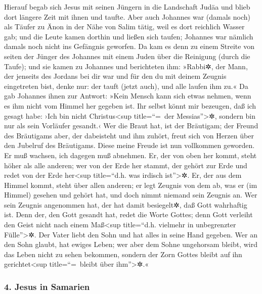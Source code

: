  Hierauf begab sich Jesus mit seinen Jüngern in die
Landschaft Judäa und blieb dort längere Zeit mit ihnen und taufte.
 Aber auch Johannes war (damals noch) als Täufer zu Änon
in der Nähe von Salim tätig, weil es dort reichlich Wasser gab; und die
Leute kamen dorthin und ließen sich taufen;  Johannes war
nämlich damals noch nicht ins Gefängnis geworfen.  Da kam
es denn zu einem Streite von seiten der Jünger des Johannes mit einem
Juden über die Reinigung (durch die Taufe);  und sie
kamen zu Johannes und berichteten ihm: »Rabbi✲, der Mann, der jenseits
des Jordans bei dir war und für den du mit deinem Zeugnis eingetreten
bist, denke nur: der tauft (jetzt auch), und alle laufen ihm zu.«
 Da gab Johannes ihnen zur Antwort: »Kein Mensch kann
sich etwas nehmen, wenn es ihm nicht vom Himmel her gegeben ist.
 Ihr selbst könnt mir bezeugen, daß ich gesagt habe: ›Ich
bin nicht Christus\textless sup title=``=~der Messias''\textgreater✲,
sondern bin nur als sein Vorläufer gesandt.‹  Wer die
Braut hat, ist der Bräutigam; der Freund des Bräutigams aber, der
dabeisteht und ihm zuhört, freut sich von Herzen über den Jubelruf des
Bräutigams. Diese meine Freude ist nun vollkommen geworden.
 Er muß wachsen, ich dagegen muß abnehmen.
 Er, der von oben her kommt, steht höher als alle
anderen; wer von der Erde her stammt, der gehört zur Erde und redet von
der Erde her\textless sup title=``d.h. was irdisch ist''\textgreater✲.
Er, der aus dem Himmel kommt, steht über allen anderen; 
er legt Zeugnis von dem ab, was er (im Himmel) gesehen und gehört hat,
und doch nimmt niemand sein Zeugnis an.  Wer sein Zeugnis
angenommen hat, der hat damit besiegelt✲, daß Gott wahrhaftig ist.
 Denn der, den Gott gesandt hat, redet die Worte Gottes;
denn Gott verleiht den Geist nicht nach einem Maß\textless sup
title=``d.h. vielmehr in unbegrenzter Fülle''\textgreater✲.
 Der Vater liebt den Sohn und hat alles in seine Hand
gegeben.  Wer an den Sohn glaubt, hat ewiges Leben; wer
aber dem Sohne ungehorsam bleibt, wird das Leben nicht zu sehen
bekommen, sondern der Zorn Gottes bleibt auf ihn gerichtet\textless sup
title=``=~bleibt über ihm''\textgreater✲.«

\hypertarget{jesus-in-samarien}{%
\subsubsection{4. Jesus in Samarien}\label{jesus-in-samarien}}

